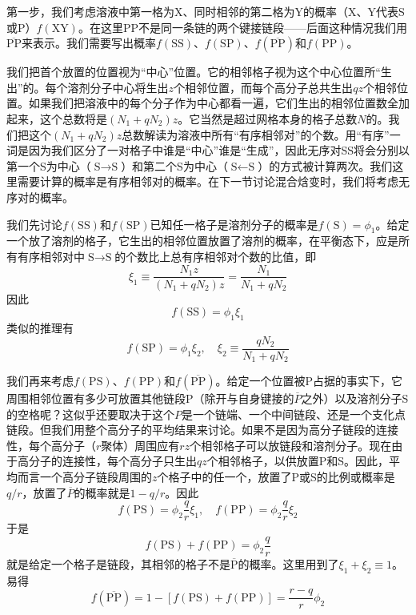 \documentclass[main.tex]{subfiles}
\begin{document}
第一步，我们考虑溶液中第一格为X、同时相邻的第二格为Y的概率（X、Y代表S或P）$f\left(\text{XY}\right)$。在这里PP不是同一条链的两个键接链段——后面这种情况我们用$\overline{\text{PP}}$来表示。我们需要写出概率$f\left(\text{SS}\right)$、$f\left(\text{SP}\right)$、$f\left(\overline{\text{PP}}\right)$和$f\left(\text{PP}\right)$。

我们把首个放置的位置视为“中心”位置。它的相邻格子视为这个中心位置所“生出”的。每个溶剂分子中心将生出$z$个相邻位置，而每个高分子总共生出$qz$个相邻位置。如果我们把溶液中的每个分子作为中心都看一遍，它们生出的相邻位置数全加起来，这个总数将是$\left(N_1+qN_2\right)z$。它当然是超过网格本身的格子总数$N$的。我们把这个$\left(N_1+qN_2\right)z$总数解读为溶液中所有“有序相邻对”的个数。用“有序”一词是因为我们区分了一对格子中谁是“中心”谁是“生成”，因此无序对SS将会分别以第一个S为中心（$\text{S}\rightarrow\text{S}$）和第二个S为中心（$\text{S}\leftarrow\text{S}$）的方式被计算两次。我们这里需要计算的概率是有序相邻对的概率。在下一节讨论混合焓变时，我们将考虑无序对的概率。

我们先讨论$f\left(\text{SS}\right)$和$f\left(\text{SP}\right)$已知任一格子是溶剂分子的概率是$f\left(\text{S}\right)=\phi_1$。给定一个放了溶剂的格子，它生出的相邻位置放置了溶剂的概率，在平衡态下，应是所有有序相邻对中$\text{S}\rightarrow\text{S}$的个数比上总有序相邻对个数的比值，即
\[\xi_1\equiv\frac{N_1 z}{\left(N_1+qN_2\right)z}=\frac{N_1}{N_1+qN_2}\]
因此
\[f\left(\text{SS}\right)=\phi_1\xi_1\]
类似的推理有
\[f\left(\text{SP}\right)=\phi_1\xi_2,\quad \xi_2\equiv\frac{qN_2}{N_1+qN_2}\]

我们再来考虑$f\left(\text{PS}\right)$、$f\left(\text{PP}\right)$和$f\left(\overline{\text{PP}}\right)$。给定一个位置被P占据的事实下，它周围相邻位置有多少可放置其他链段P（除开与自身键接的$\overline{P}$之外）以及溶剂分子S的空格呢？这似乎还要取决于这个$P$是一个链端、一个中间链段、还是一个支化点链段。但我们用整个高分子的平均结果来讨论。如果不是因为高分子链段的连接性，每个高分子（$r$聚体）周围应有$rz$个相邻格子可以放链段和溶剂分子。现在由于高分子的连接性，每个高分子只生出$qz$个相邻格子，以供放置P和S。因此，平均而言一个高分子链段周围的$z$个格子中的任一个，放置了P或S的比例或概率是$q/r$，放置了$\overline{P}$的概率就是$1-q/r$。因此
\[f\left(\text{PS}\right)=\phi_2\frac{q}{r}\xi_1,\quad f\left(\text{PP}\right)=\phi_2\frac{q}{r}\xi_2\]
于是
\[f\left(\text{PS}\right)+f\left(\text{PP}\right)=\phi_2\frac{q}{r}\]
就是给定一个格子是链段，其相邻的格子不是$\overline{\text{P}}$的概率。这里用到了$\xi_1+\xi_2\equiv 1$。易得
\[f\left(\overline{\text{PP}}\right)=1-\left[f\left(\text{PS}\right)+f\left(\text{PP}\right)\right]=\frac{r-q}{r}\phi_2\]
\end{document}
